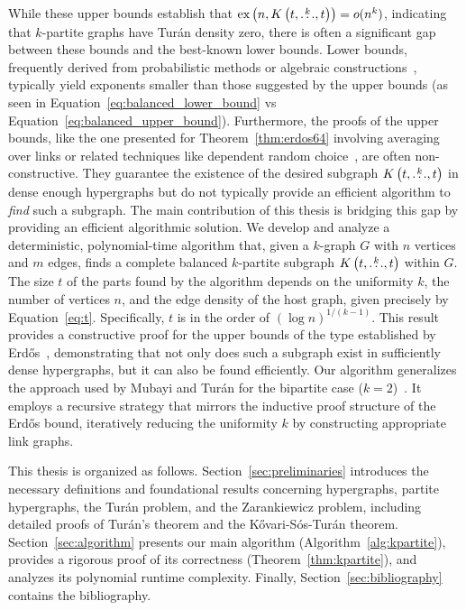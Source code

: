 While these upper bounds establish that $\text{ex} \left( n, K\left(t, \overset{k}{\dots}, t\right) \right) = o(n^k)$, indicating that $k$-partite graphs have Turán density zero, there is often a significant gap between these bounds and the best-known lower bounds.
Lower bounds, frequently derived from probabilistic methods or algebraic constructions~\cite{kollar1996norm, brown1966graphs, conlon2020random},
typically yield exponents smaller than those suggested by the upper bounds
(as seen in Equation~\eqref{eq:balanced_lower_bound} vs Equation~\eqref{eq:balanced_upper_bound}).
Furthermore, the proofs of the upper bounds, like the one presented for Theorem~\ref{thm:erdos64}
involving averaging over links or related techniques like dependent random choice~\cite{fox2011dependent},
are often non-constructive.
They guarantee the existence of the desired subgraph $K\left(t, \overset{k}{\dots}, t\right)$ in dense enough hypergraphs but do not typically provide an efficient algorithm to \emph{find} such a subgraph.
The main contribution of this thesis is bridging this gap by providing an efficient algorithmic solution.
We develop and analyze a deterministic, polynomial-time algorithm that, given a $k$-graph $G$ with $n$ vertices and $m$ edges, finds a complete balanced $k$-partite subgraph $K\left(t, \overset{k}{\dots}, t\right)$ within $G$.
The size $t$ of the parts found by the algorithm depends on the uniformity $k$, the number of vertices $n$, and the edge density of the host graph, given precisely by Equation~\eqref{eq:t}.
Specifically, $t$ is in the order of $(\log n)^{1/(k-1)}$.
This result provides a constructive proof for the upper bounds of the type established by Erdős~\cite{Erods1964},
demonstrating that not only does such a subgraph exist in sufficiently dense hypergraphs, but it can also be found efficiently.
Our algorithm generalizes the approach used by Mubayi and Turán for the bipartite case ($k=2$)~\cite{MUBAYI2010174}.
It employs a recursive strategy that mirrors the inductive proof structure of the Erdős bound,
iteratively reducing the uniformity $k$ by constructing appropriate link graphs.

This thesis is organized as follows.
Section~\ref{sec:preliminaries} introduces the necessary definitions and foundational results concerning hypergraphs, partite hypergraphs, the Turán problem, and the Zarankiewicz problem,
including detailed proofs of Turán's theorem and the Kővari-Sós-Turán theorem.
Section~\ref{sec:algorithm} presents our main algorithm (Algorithm~\ref{alg:kpartite}), provides a rigorous proof of its correctness (Theorem~\ref{thm:kpartite}),
and analyzes its polynomial runtime complexity.
Finally, Section~\ref{sec:bibliography} contains the bibliography.